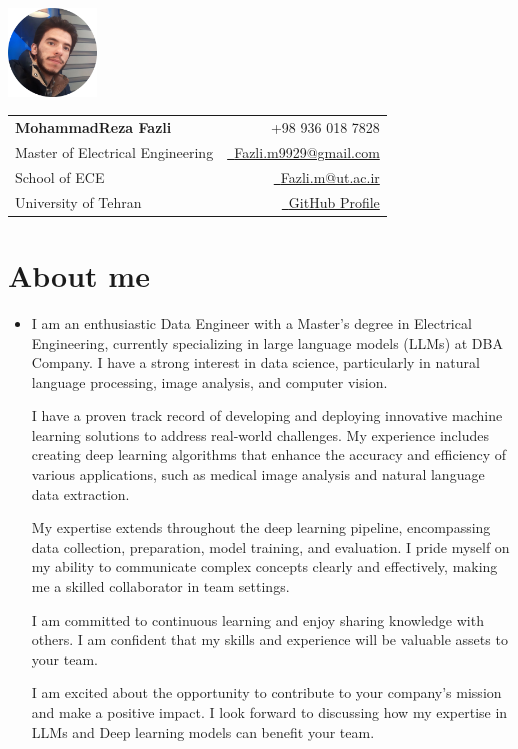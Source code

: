 \documentclass[a4paper,11pt]{article}
\makeatletter
\newcommand{\name}{MohammadReza Fazli} %
\newcommand{\course}{Master of Electrical Engineering} %
\newcommand{\phone}{936 018 7828} %
\newcommand{\emaila}{Fazli.m9929@gmail.com} %
\newcommand{\emailb}{Fazli.m@ut.ac.ir} %
\makeatother
\begin{document}
\selectfont


\parbox{2.6cm}{%
\includegraphics[width=2.35cm,clip]{my_pic.png}
}
\parbox{\dimexpr\linewidth-2.9cm\relax}{
\begin{tabularx}{\linewidth}{L r} \\
  \textbf{\Large \name} & {\raisebox{0.0\height}{\footnotesize \faPhone}\ +98 \phone}\\
  \course & \href{mailto:\emaila}{\raisebox{0.0\height}{\footnotesize \faEnvelope}\ {\emaila}} \\
  {School of ECE} &  \href{mailto:\emailb}{\raisebox{0.0\height}{\footnotesize \faEnvelope}\ {\emailb}}\\
  {University of Tehran} &  \href{https://github.com/fazli-m9929/}{\raisebox{0.0\height}{\footnotesize \faGithub}\ {GitHub Profile}} \\
\end{tabularx}
}


\section{\textbf{About me}}
  \justifying
  \begin{itemize}[leftmargin=0.1in, label={}]
    \item{
      I am an enthusiastic Data Engineer with a Master’s degree in Electrical Engineering, currently specializing in large language models (LLMs) at DBA Company. I have a strong interest in data science, particularly in natural language processing, image analysis, and computer vision.
    
      I have a proven track record of developing and deploying innovative machine learning solutions to address real-world challenges. My experience includes creating deep learning algorithms that enhance the accuracy and efficiency of various applications, such as medical image analysis and natural language data extraction.
    
      My expertise extends throughout the deep learning pipeline, encompassing data collection, preparation, model training, and evaluation. I pride myself on my ability to communicate complex concepts clearly and effectively, making me a skilled collaborator in team settings.
    
      I am committed to continuous learning and enjoy sharing knowledge with others. I am confident that my skills and experience will be valuable assets to your team.
    
      I am excited about the opportunity to contribute to your company's mission and make a positive impact. I look forward to discussing how my expertise in LLMs and Deep learning models can benefit your team.
    }
    
 \end{itemize}
 \vspace{-16pt}
\end{document}
